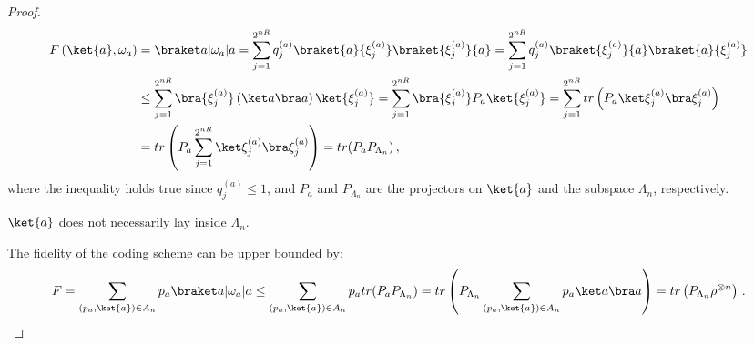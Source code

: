 \documentclass[12pt,a4paper]{article}
\begin{document}
\begin{proof}
        \begin{align*}
            F \left( \ket{a}, \omega_a \right) &= \brakett{a}{\omega_a}{a} =
            \sum_{j=1}^{2^{nR}} q_j^{(a)} \braket{a}{\xi_j^{(a)}}
            \braket{\xi_j^{(a)}}{a}
            = \sum_{j=1}^{2^{nR}} q_j^{(a)} \braket{\xi_j^{(a)}}{a}
            \braket{a}{\xi_j^{(a)}} \\
            &\leq \sum_{j=1}^{2^{nR}} \bra{\xi_j^{(a)}} \left(\ketbra{a}\right) \ket{\xi_j^{(a)}}
            = \sum_{j=1}^{2^{nR}} \bra{\xi_j^{(a)}} P_a \ket{\xi_j^{(a)}}
            = \sum_{j=1}^{2^{nR}} tr \left( P_a \ketbra{\xi_j^{(a)}} \right)
            \\
            &= tr \left( P_a \sum_{j=1}^{2^{nR}} \ketbra{\xi_j^{(a)}} \right)
            = tr(P_a P_{\Lambda_n}) \,,
        \end{align*}
        where the inequality holds true since $q_j^{(a)} \leq 1$, and $P_a$
        and $P_{\Lambda_n}$ are the projectors on $\ket{a}$ and the subspace
        $\Lambda_n$, respectively.

        \begin{remark}
            $\ket{a}$ does not necessarily lay inside $\Lambda_n$.
        \end{remark}

        The fidelity of the coding scheme can be upper bounded by:
        \begin{align}
        \label{eq:Compress_UB}
            F = \sum_{\left(p_a, \ket{a}\right) \in A_n} p_a
            \brakett{a}{\omega_a}{a}
            \leq \sum_{\left(p_a, \ket{a}\right) \in A_n} p_a tr(P_a
            P_{\Lambda_n}) = tr\left(P_{\Lambda_n} \sum_{\left(p_a, \ket{a}\right) \in A_n} p_a \ketbra{a} \right)
            = tr\left(P_{\Lambda_n} \rho^{\otimes n}\right) \,.
        \end{align}
\end{proof}
\end{document}
